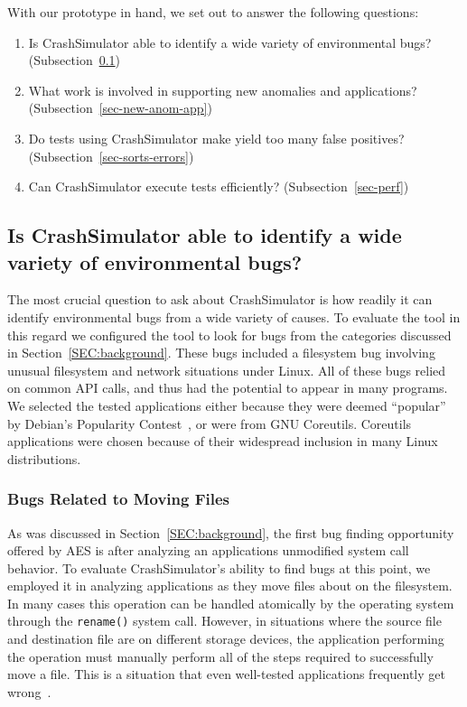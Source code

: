 With our prototype in hand, we
set out to answer the following questions:

\begin{enumerate}

\item{Is CrashSimulator able to identify a wide variety of environmental
    bugs?
(Subsection~\ref{sec-env-bugs})}

\item{What work is involved in supporting new anomalies and applications?
    (Subsection~\ref{sec-new-anom-app})}

\item{Do tests using CrashSimulator make yield too many false positives?
      (Subsection~\ref{sec-sorts-errors})}

\item{Can CrashSimulator
      execute tests efficiently? (Subsection~\ref{sec-perf})}

\end{enumerate}

\subsection{Is CrashSimulator able to identify a wide variety of
environmental bugs?}
\label{sec-env-bugs}

The most crucial question to ask about CrashSimulator is how readily it can
identify environmental bugs from a wide variety of causes.  To evaluate the
tool in this regard we configured the tool to look for bugs from the
categories discussed in Section~\ref{SEC:background}.  These bugs included
a filesystem bug involving unusual filesystem and network situations under
Linux.
All of these bugs relied on common API calls, and thus had the potential to
appear in many programs.  We selected the tested applications either
because they were deemed ``popular'' by Debian's Popularity
Contest~\cite{DebPopCon}, or were from GNU Coreutils.  Coreutils
applications were chosen because of their widespread inclusion in many
Linux distributions.


\subsubsection{Bugs Related to Moving Files}

As was discussed in Section~\ref{SEC:background}, the first bug finding
opportunity offered by AES is after analyzing an applications unmodified
system call behavior.  To evaluate CrashSimulator's ability to find bugs at
this point, we employed it in analyzing applications as they move files
about on the filesystem.  In many cases this operation can be handled
atomically by the operating system through the {\tt rename()} system call.
However, in situations where the source file and destination file are on
different storage devices, the application performing the operation must
manually perform all of the steps required to successfully move a file.
This is a situation that even well-tested applications
frequently get wrong~\cite{PHPRenameBug,PythonShutilBug,NodejsCopyBug}.

